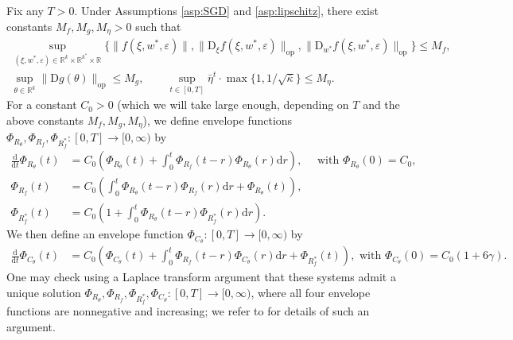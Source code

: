\documentclass[11pt,letterpaper,reqno]{amsart}
\theoremstyle{definition}
\def\eps{\varepsilon}
\def\d{\mathrm{d}}
\def\D{\mathrm{D}}
\def\R{\mathbb{R}}
\def\op{\mathrm{op}}
\def\Ct{C_\theta}
\def\Rt{R_\theta}
\def\Rf{R_f}
\def\pCt{\Phi_{\Ct}}
\def\pRt{\Phi_{\Rt}}
\def\pRf{\Phi_{\Rf}}
\def\pRfs{\Phi_{\Rf^*}}
\newcommand{\prn}[1]{\left({#1}\right)} %
\begin{document}
Fix any $T>0$. Under Assumptions \ref{asp:SGD} and \ref{asp:lipschitz}, there
exist constants $M_f,M_g,M_\eta>0$ such that
\begin{equation}\label{eq:defMbounds}
\begin{gathered}
\sup_{(\xi,w^*,\eps) \in \R^k \times \R^{k^*} \times \R}
\{\|f(\xi,w^*,\eps)\|,\|\D_\xi f(\xi,w^*,\eps)\|_\op,
\|\D_{w^*} f(\xi,w^*,\eps)\|_\op\} \leq M_f,\\
\sup_{\theta \in \R^k} \|\D g(\theta)\|_\op \leq M_g,
\qquad \sup_{t \in [0,T]} \bar \eta^t \cdot \max\{1,1/\sqrt{\bar\kappa}\}
\leq M_\eta.
\end{gathered}
\end{equation}
For a constant $C_0>0$ (which we will take large enough, depending on $T$ and
the above constants $M_f,M_g,M_\eta$),
we define envelope functions $\pRt,\pRf,\pRfs:[0,T] \to [0,\infty)$ by
\begin{align}
\frac{\d}{\d t}\pRt(t)&=C_0\prn{\pRt(t)+\int_0^t \pRf(t-r) \pRt(r) \d r},
\quad \text{ with } \pRt(0)=C_0,\label{eq:def-pRt}\\
\pRf(t) &= C_0\prn{\int_0^t \pRt(t-r) \pRf(r) \d r +
\pRt(t)},\label{eq:def-pRf}\\
\pRfs(t)&=C_0\left(1+\int_0^t \pRt(t-r)\pRfs(r)\d r\right).\label{eq:def-pRfs}
\end{align}
We then define an envelope function $\pCt:[0,T] \to [0,\infty)$ by
\begin{align}
\frac{\d}{\d t}\pCt(t)&=C_0\left(\pCt(t)
+\int_0^t \Phi_{R_f}(t-r)\pCt(r)\d r+\Phi_{R_f^*}(t)\right),
\text{ with } \pCt(0)=C_0(1+6\gamma).
\label{eq:def-pCt}
\end{align}
One may check using a Laplace transform argument that
these systems admit a unique solution $\pRt,\pRf,\pRfs,\pCt:[0,T] \to
[0,\infty)$, where all four envelope functions are nonnegative and increasing;
we refer to \cite[Lemma 3.1]{fan2025dynamical1} for details of such an argument.
\end{document}
